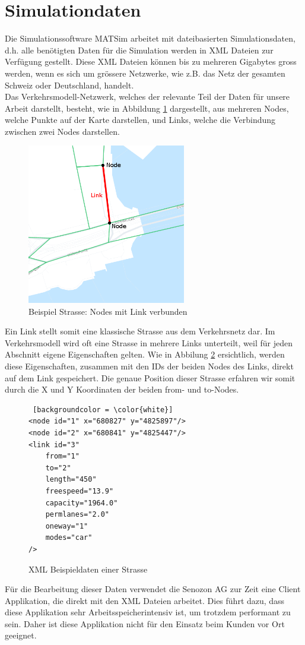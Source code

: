 \section{Simulationdaten}
Die Simulationssoftware MATSim arbeitet mit dateibasierten Simulationsdaten, d.h. alle benötigten Daten für die Simulation werden in XML Dateien zur Verfügung gestellt. Diese XML Dateien können bis zu mehreren Gigabytes gross werden, wenn es sich um grössere Netzwerke, wie z.B. das Netz der gesamten Schweiz oder Deutschland, handelt.\\
Das Verkehrsmodell-Netzwerk, welches der relevante Teil der Daten für unsere Arbeit darstellt, besteht, wie in Abbildung \ref{example_street} dargestellt, aus mehreren Nodes, welche Punkte auf der Karte darstellen, und Links, welche die Verbindung zwischen zwei Nodes darstellen.\\
\begin{figure}[H]
\centering
\includegraphics[height=7cm]{images/Link_demo_edited.PNG}
\caption{Beispiel Strasse: Nodes mit Link verbunden}
\label{example_street}
\end{figure}
\noindent
Ein Link stellt somit eine klassische Strasse aus dem Verkehrsnetz dar. Im Verkehrsmodell wird oft eine Strasse in mehrere Links unterteilt, weil für jeden Abschnitt eigene Eigenschaften gelten. Wie in Abbilung \ref{street_details} ersichtlich, werden diese Eigenschaften, zusammen mit den IDs der beiden Nodes des Links, direkt auf dem Link gespeichert. Die genaue Position dieser Strasse erfahren wir somit durch die X und Y Koordinaten der beiden \glqq{}from\grqq{}- und \glqq{}to\grqq{}-Nodes. \\
\begin{figure}[H]
\centering
\lstset{language=XML}
\begin{lstlisting} [backgroundcolor = \color{white}]
<node id="1" x="680827" y="4825897"/>
<node id="2" x="680841" y="4825447"/>
<link id="3" 
	from="1" 
	to="2" 
	length="450" 
	freespeed="13.9" 
	capacity="1964.0" 
	permlanes="2.0" 
	oneway="1" 
	modes="car"
/>
\end{lstlisting}
\caption{XML Beispieldaten einer Strasse}
\label{street_details}
\end{figure}
\noindent
Für die Bearbeitung dieser Daten verwendet die Senozon AG zur Zeit eine Client Applikation, die direkt mit den XML Dateien arbeitet. Dies führt dazu, dass diese Applikation sehr Arbeitsspeicherintensiv ist, um trotzdem performant zu sein. Daher ist diese Applikation nicht für den Einsatz beim Kunden vor Ort geeignet.
